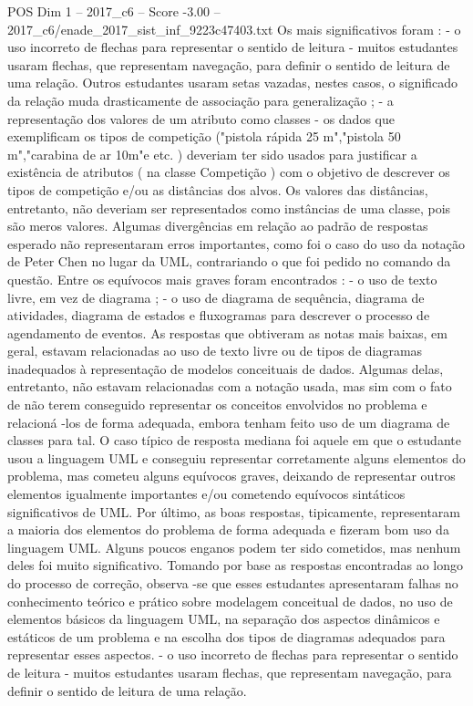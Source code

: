 \begin{textsample}{POS Dim 1 – 2017\_c6 – Score -3.00 – 2017\_c6/enade\_2017\_sist\_inf\_9223c47403.txt}
Os mais significativos foram : - o uso incorreto de flechas para representar o sentido de leitura - muitos estudantes usaram flechas, que representam navegação, para definir o sentido de leitura de uma relação.
Outros estudantes usaram setas vazadas, nestes casos, o significado da relação muda drasticamente de associação para generalização ; - a representação dos valores de um atributo como classes - os dados que exemplificam os tipos de competição ("pistola rápida 25 m","pistola 50 m","carabina de ar 10m"e etc. ) deveriam ter sido usados para justificar a existência de atributos ( na classe Competição ) com o objetivo de descrever os tipos de competição e/ou as distâncias dos alvos.
Os valores das distâncias, entretanto, não deveriam ser representados como instâncias de uma classe, pois são meros valores.
Algumas divergências em relação ao padrão de respostas esperado não representaram erros importantes, como foi o caso do uso da notação de Peter Chen no lugar da UML, contrariando o que foi pedido no comando da questão.
Entre os equívocos mais graves foram encontrados : - o uso de texto livre, em vez de diagrama ; - o uso de diagrama de sequência, diagrama de atividades, diagrama de estados e fluxogramas para descrever o processo de agendamento de eventos.
As respostas que obtiveram as notas mais baixas, em geral, estavam relacionadas ao uso de texto livre ou de tipos de diagramas inadequados à representação de modelos conceituais de dados.
Algumas delas, entretanto, não estavam relacionadas com a notação usada, mas sim com o fato de não terem conseguido representar os conceitos envolvidos no problema e relacioná -los de forma adequada, embora tenham feito uso de um diagrama de classes para tal.
O caso típico de resposta mediana foi aquele em que o estudante usou a linguagem UML e conseguiu representar corretamente alguns elementos do problema, mas cometeu alguns equívocos graves, deixando de representar outros elementos igualmente importantes e/ou cometendo equívocos sintáticos significativos de UML.
Por último, as boas respostas, tipicamente, representaram a maioria dos elementos do problema de forma adequada e fizeram bom uso da linguagem UML.
Alguns poucos enganos podem ter sido cometidos, mas nenhum deles foi muito significativo.
Tomando por base as respostas encontradas ao longo do processo de correção, observa -se que esses estudantes apresentaram falhas no conhecimento teórico e prático sobre modelagem conceitual de dados, no uso de elementos básicos da linguagem UML, na separação dos aspectos dinâmicos e estáticos de um problema e na escolha dos tipos de diagramas adequados para representar esses aspectos. - o uso incorreto de flechas para representar o sentido de leitura - muitos estudantes usaram flechas, que representam navegação, para definir o sentido de leitura de uma relação.

\end{textsample}
